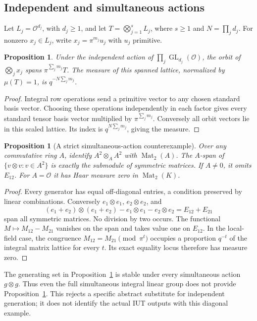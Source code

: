 \documentclass[11pt]{amsart}
\newtheorem{proposition}[theorem]{Proposition}
\theoremstyle{definition}
\theoremstyle{remark}
\newcommand{\OO}{\mathcal O}
\newcommand{\GL}{\operatorname{GL}}
\newcommand{\Mat}{\operatorname{Mat}}
\begin{document}
\subsection{Independent and simultaneous actions}
Let $L_j=\OO^{d_j}$, with $d_j\ge1$, and let
$T=\bigotimes_{j=1}^s L_j$, where $s\ge1$ and
$N=\prod_jd_j$. For nonzero $x_j\in L_j$, write
$x_j=\pi^{m_j}u_j$ with $u_j$ primitive.

\begin{proposition}\label{prop:independent}
Under the independent action of $\prod_j\GL_{d_j}(\OO)$,
the orbit of $\bigotimes_jx_j$ spans
$\pi^{\sum_jm_j}T$. The measure of this spanned lattice, normalized by
$\mu(T)=1$, is
$q^{-N\sum_jm_j}$.
\end{proposition}
\begin{proof}
Integral row operations send a primitive vector to any chosen standard
basis vector. Choosing these operations independently in each factor gives
every standard tensor basis vector multiplied by $\pi^{\sum_jm_j}$.
Conversely all orbit vectors lie in this scaled lattice.
Its index is $q^{N\sum_jm_j}$, giving the measure.
\end{proof}

\begin{proposition}[A strict simultaneous-action counterexample]\label{prop:diagonal}
Over any commutative ring $A$, identify $A^2\otimes_AA^2$ with
$\Mat_2(A)$. The $A$-span of $\{v\otimes v:v\in A^2\}$ is exactly
the submodule of symmetric matrices. If $A\ne0$, it omits $E_{12}$.
For $A=\OO$ it has Haar measure zero in $\Mat_2(K)$.
\end{proposition}
\begin{proof}
Every generator has equal off-diagonal entries, a condition preserved by
linear combinations. Conversely $e_1\otimes e_1$, $e_2\otimes e_2$, and
\[
 (e_1+e_2)\otimes(e_1+e_2)-e_1\otimes e_1-e_2\otimes e_2
 =E_{12}+E_{21}
\]
span all symmetric matrices. No division by two occurs.
The functional $M\mapsto M_{12}-M_{21}$ vanishes on the span and takes
value one on $E_{12}$. In the local-field case, the congruence
$M_{12}=M_{21}\pmod{\pi^t}$ occupies a proportion $q^{-t}$ of the
integral matrix lattice for every $t$. Its exact equality locus therefore
has measure zero.
\end{proof}

The generating set in Proposition~\ref{prop:diagonal} is stable under every
simultaneous action $g\otimes g$. Thus even the full simultaneous integral
linear group does not provide Proposition~\ref{prop:independent}.
This rejects a specific abstract substitute for independent generation; it
does not identify the actual IUT outputs with this diagonal example.
\end{document}
